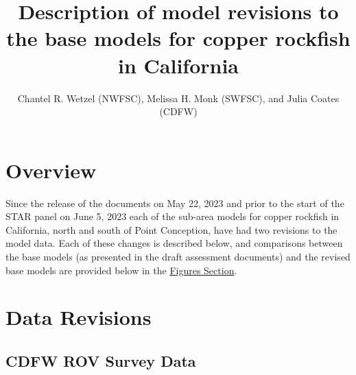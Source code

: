 \documentclass[
  letterpaper,
]{article}
\title{Description of model revisions to the base models for copper rockfish in California}
\author{Chantel R. Wetzel (NWFSC), Melissa H. Monk (SWFSC), and Julia Coates (CDFW)}
\date{}
\begin{document}
\maketitle

{
\setcounter{tocdepth}{2}
\tableofcontents
}
\pagebreak

\hypertarget{overview}{%
\section{Overview}\label{overview}}

Since the release of the documents on May 22, 2023 and prior to the start of the STAR panel on June 5, 2023 each of the sub-area models for copper rockfish in California, north and south of Point Conception, have had two revisions to the model data. Each of these changes is described below, and comparisons between the base models (as presented in the draft assessment documents) and the revised base models are provided below in the \protect\hyperlink{figures}{Figures Section}.

\hypertarget{data-revisions}{%
\section{Data Revisions}\label{data-revisions}}

\hypertarget{cdfw-rov-survey-data}{%
\subsection{CDFW ROV Survey Data}\label{cdfw-rov-survey-data}}
\end{document}
